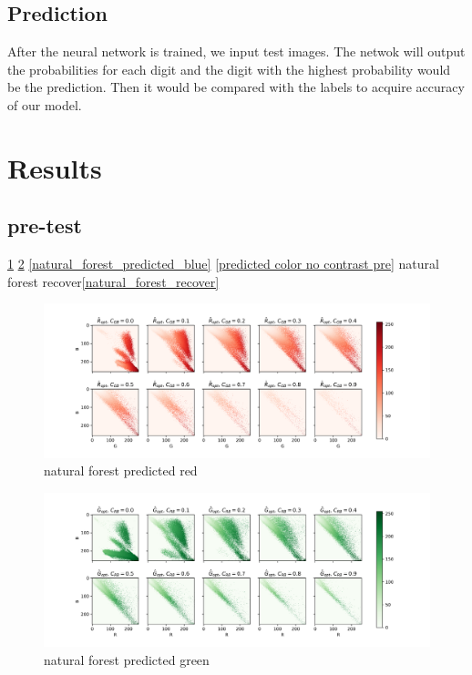 \documentclass[11pt]{scrartcl} %
\begin{document}
\subsection{Prediction}
After the neural network is trained, we input test images. The netwok will output the probabilities for each digit and the digit with the highest probability would be the prediction. Then it would be compared with the labels to acquire accuracy of our model.


\section{Results}

\subsection{pre-test}

\ref{natural_forest_predicted_red}
\ref{natural_forest_predicted_green}
\ref{natural_forest_predicted_blue}
\ref{predicted color no contrast pre}
natural forest recover\ref{natural_forest_recover}

\begin{figure}[h] %
	\centering
	\includegraphics[width=1\columnwidth]{Figure/natural_forest_predicted_red} %
	\caption{natural forest predicted red}
	\label{natural_forest_predicted_red}
\end{figure}

\begin{figure}[h] %
	\centering
	\includegraphics[width=1\columnwidth]{Figure/natural_forest_predicted_green} %
	\caption{natural forest predicted green}
	\label{natural_forest_predicted_green}
\end{figure}
\end{document}
